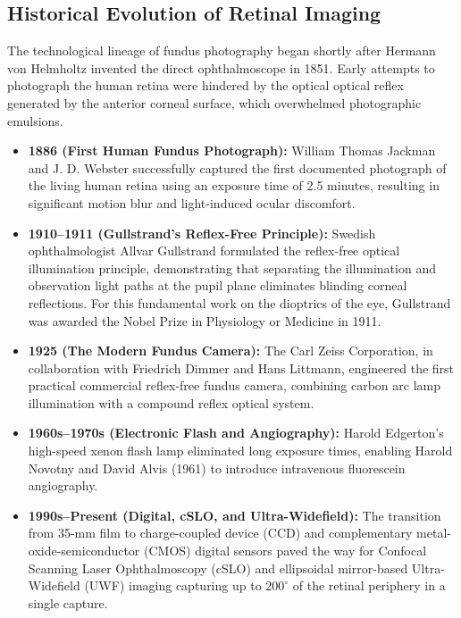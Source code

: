 \documentclass[11pt,a4paper]{article}
\begin{document}
\subsection{Historical Evolution of Retinal Imaging}

The technological lineage of fundus photography began shortly after Hermann von Helmholtz invented the direct ophthalmoscope in 1851. Early attempts to photograph the human retina were hindered by the optical optical reflex generated by the anterior corneal surface, which overwhelmed photographic emulsions.

\begin{itemize}[leftmargin=*]
    \item \textbf{1886 (First Human Fundus Photograph):} William Thomas Jackman and J. D. Webster successfully captured the first documented photograph of the living human retina using an exposure time of 2.5 minutes, resulting in significant motion blur and light-induced ocular discomfort.
    \item \textbf{1910--1911 (Gullstrand's Reflex-Free Principle):} Swedish ophthalmologist Allvar Gullstrand formulated the reflex-free optical illumination principle, demonstrating that separating the illumination and observation light paths at the pupil plane eliminates blinding corneal reflections. For this fundamental work on the dioptrics of the eye, Gullstrand was awarded the Nobel Prize in Physiology or Medicine in 1911.
    \item \textbf{1925 (The Modern Fundus Camera):} The Carl Zeiss Corporation, in collaboration with Friedrich Dimmer and Hans Littmann, engineered the first practical commercial reflex-free fundus camera, combining carbon arc lamp illumination with a compound reflex optical system.
    \item \textbf{1960s--1970s (Electronic Flash and Angiography):} Harold Edgerton's high-speed xenon flash lamp eliminated long exposure times, enabling Harold Novotny and David Alvis (1961) to introduce intravenous fluorescein angiography.
    \item \textbf{1990s--Present (Digital, cSLO, and Ultra-Widefield):} The transition from 35-mm film to charge-coupled device (CCD) and complementary metal-oxide-semiconductor (CMOS) digital sensors paved the way for Confocal Scanning Laser Ophthalmoscopy (cSLO) and ellipsoidal mirror-based Ultra-Widefield (UWF) imaging capturing up to $200^\circ$ of the retinal periphery in a single capture.
\end{itemize}
\end{document}
